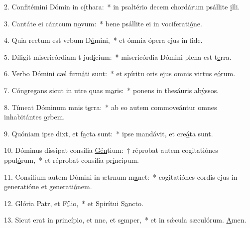 2. Confitémini Dómin in c\uline{í}thara:~* in psaltério decem chordárum psállite \uline{i}lli.\par 
3. Cantáte ei cántcum n\uline{o}vum:~* bene psállite ei in vociferati\uline{ó}ne.\par 
4. Quia rectum est vrbum D\uline{ó}mini,~* et ómnia ópera ejus in f\uline{i}de.\par 
5. Díligit misericórdiam t jud\uline{í}cium:~* misericórdia Dómini plena est t\uline{e}rra.\par 
6. Verbo Dómini cæl firm\uline{á}ti sunt:~* et spíritu oris ejus omnis virtus e\uline{ó}rum.\par 
7. Cóngregans sicut in utre quas m\uline{a}ris:~* ponens in thesáuris ab\uline{ý}ssos.\par 
8. Tímeat Dóminum mnis t\uline{e}rra:~* ab eo autem commoveántur omnes inhabitántes \uline{o}rbem.\par 
9. Quóniam ipse dixt, et f\uline{a}cta sunt:~* ipse mandávit, et cre\uline{á}ta sunt.\par 
10. Dóminus díssipat consília \uline{Gén}tium:~† réprobat autem cogitatiónes ppul\uline{ó}rum,~* et réprobat consília pr\uline{í}ncipum.\par 
11. Consílium autem Dómini in ætrnum m\uline{a}net:~* cogitatiónes cordis ejus in generatióne et generati\uline{ó}nem.\par 
12. Glória Patr, et F\uline{í}lio,~* et Spirítui S\uline{a}ncto.\par 
13. Sicut erat in princípio, et nnc, et s\uline{e}mper,~* et in sǽcula sæculórum. \uline{A}men.\par 
